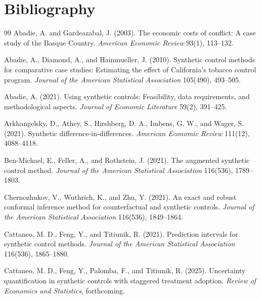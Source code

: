 \documentclass[11pt]{article}
\theoremstyle{definition}
\theoremstyle{plain}
\theoremstyle{remark}
\begin{document}
\section*{Bibliography}
\begin{thebibliography}{99}
Abadie, A. and Gardeazabal, J. (2003).
The economic costs of conflict: A case study of the Basque Country.
\emph{American Economic Review} 93(1), 113--132.

Abadie, A., Diamond, A., and Hainmueller, J. (2010).
Synthetic control methods for comparative case studies: Estimating the effect of California's tobacco control program.
\emph{Journal of the American Statistical Association} 105(490), 493--505.

Abadie, A. (2021).
Using synthetic controls: Feasibility, data requirements, and methodological aspects.
\emph{Journal of Economic Literature} 59(2), 391--425.

Arkhangelsky, D., Athey, S., Hirshberg, D. A., Imbens, G. W., and Wager, S. (2021).
Synthetic difference-in-differences.
\emph{American Economic Review} 111(12), 4088--4118.

Ben-Michael, E., Feller, A., and Rothstein, J. (2021).
The augmented synthetic control method.
\emph{Journal of the American Statistical Association} 116(536), 1789--1803.

Chernozhukov, V., Wuthrich, K., and Zhu, Y. (2021).
An exact and robust conformal inference method for counterfactual and synthetic controls.
\emph{Journal of the American Statistical Association} 116(536), 1849--1864.

Cattaneo, M. D., Feng, Y., and Titiunik, R. (2021).
Prediction intervals for synthetic control methods.
\emph{Journal of the American Statistical Association} 116(536), 1865--1880.

Cattaneo, M. D., Feng, Y., Palomba, F., and Titiunik, R. (2025).
Uncertainty quantification in synthetic controls with staggered treatment adoption.
\emph{Review of Economics and Statistics}, forthcoming.


\end{thebibliography}
\end{document}
